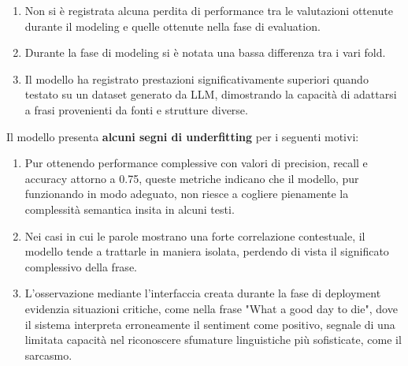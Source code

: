\documentclass[12pt,a4paper]{report} %
\begin{document}
\begin{enumerate}
    \item Non si è registrata alcuna perdita di performance tra le valutazioni ottenute durante il modeling e quelle ottenute nella fase di evaluation. 
    \item Durante la fase di modeling si è notata una bassa differenza tra i vari fold.
    \item  Il modello ha registrato prestazioni significativamente superiori quando testato su un dataset generato da LLM, dimostrando la capacità di adattarsi a frasi provenienti da fonti e strutture diverse. 
\end{enumerate}
Il modello presenta \textbf{alcuni segni di underfitting} per i seguenti motivi:
\begin{enumerate}
    \item Pur ottenendo performance complessive con valori di precision, recall e accuracy attorno a 0.75, queste metriche indicano che il modello, pur funzionando in modo adeguato, non riesce a cogliere pienamente la complessità semantica insita in alcuni testi.
    \item Nei casi in cui le parole mostrano una forte correlazione contestuale, il modello tende a trattarle in maniera isolata, perdendo di vista il significato complessivo della frase.
    \item  L'osservazione mediante l'interfaccia creata durante la fase di deployment evidenzia situazioni critiche, come nella frase "What a good day to die", dove il sistema interpreta erroneamente il sentiment come positivo, segnale di una limitata capacità nel riconoscere sfumature linguistiche più sofisticate, come il sarcasmo.
\end{enumerate}
\end{document}
